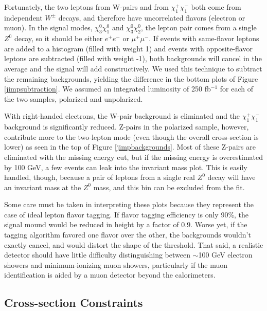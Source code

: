 \documentclass[12pt]{article}
\begin{document}
Fortunately, the two leptons from W-pairs and from $\chi_1^+\chi_1^-$
both come from independent $W^\pm$ decays, and therefore have
uncorrelated flavors (electron or muon).  In the signal modes,
$\chi_3^0\chi_1^0$ and $\chi_3^0\chi_2^0$, the lepton pair comes from
a single $Z^0$ decay, so it should be either $e^+e^-$ or $\mu^+\mu^-$.
If events with same-flavor leptons are added to a histogram (filled
with weight 1) and events with opposite-flavor leptons are subtracted
(filled with weight -1), both backgrounds will cancel in the average
and the signal will add constructively.  We used this technique to
subtract the remaining backgrounds, yielding the difference in the
bottom plots of Figure \ref{jimpsubtraction}.  We assumed an
integrated luminosity of 250 fb$^{-1}$ for each of the two samples,
polarized and unpolarized.

With right-handed electrons, the W-pair background is eliminated and
the $\chi_1^+\chi_1^-$ background is significantly reduced.  Z-pairs
in the polarized sample, however, contribute more to the two-lepton
mode (even though the overall cross-section is lower) as seen in the
top of Figure \ref{jimpbackgrounds}.  Most of these Z-pairs are
eliminated with the missing energy cut, but if the missing energy is
overestimated by 100 GeV, a few events can leak into the invariant
mass plot.  This is easily handled, though, because a pair of leptons
from a single real $Z^0$ decay will have an invariant mass at the
$Z^0$ mass, and this bin can be excluded from the fit.

Some care must be taken in interpreting these plots because they
represent the case of ideal lepton flavor tagging.  If flavor tagging
efficiency is only 90\%, the signal mound would be reduced in height
by a factor of 0.9.  Worse yet, if the tagging algorithm favored one
flavor over the other, the backgrounds wouldn't exactly cancel, and
would distort the shape of the threshold.  That said, a realistic
detector should have little difficulty distinguishing between
$\sim$100 GeV electron showers and minimum-ionizing muon showers,
particularly if the muon identification is aided by a muon detector
beyond the calorimeters.

\subsection{Cross-section Constraints}
\end{document}
